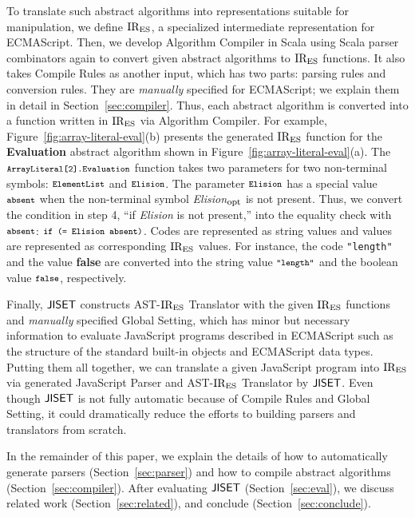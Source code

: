 To translate such abstract algorithms into representations
suitable for manipulation, we define \( \text{IR}_\text{ES} \), a specialized
intermediate representation for ECMAScript.  Then,
we develop \textsf{Algorithm Compiler} in Scala using Scala parser
combinators again to convert given abstract algorithms to \( \text{IR}_\text{ES} \)
functions.  It also takes \textsf{Compile Rules} as another input,
which has two parts: parsing rules and conversion rules.  They are
\textit{manually} specified for ECMAScript; we explain them in
detail in Section~\ref{sec:compiler}.  Thus, each abstract algorithm is
converted into a function written in \( \text{IR}_\text{ES} \) via \textsf{Algorithm Compiler}.
For example, Figure~\ref{fig:array-literal-eval}(b) presents the generated
\( \text{IR}_\text{ES} \) function for the \textbf{Evaluation} abstract algorithm shown in
Figure~\ref{fig:array-literal-eval}(a).
The \( \texttt{\footnotesize ArrayLiteral[2].Evaluation} \) function takes two parameters for
two non-terminal symbols: \( \texttt{\footnotesize ElementList} \) and \( \texttt{\footnotesize Elision} \).
The parameter \( \texttt{\footnotesize Elision} \) has a special value \( \texttt{\footnotesize absent} \) when
the non-terminal symbol \textit{Elision}$_{\mbox{\footnotesize opt}}$ is not
present.  Thus, we convert the condition in step 4,
``if \textit{Elision} is not present,'' into the equality check with \(
\texttt{\footnotesize absent} \): \( \texttt{\footnotesize if (= Elision absent)} \).  Codes are represented as
string values and values are represented as corresponding \( \text{IR}_\text{ES} \) values.
For instance, the code \texttt{\small "length"} and the value \textbf{false} are
converted into the string value \( \texttt{\footnotesize"length"} \) and the boolean value
\( \texttt{\footnotesize false} \), respectively.

Finally, \( \text{\sf JISET} \) constructs {\sf AST-\( \text{IR}_\text{ES} \) Translator} with the given
\( \text{IR}_\text{ES} \) functions and \textit{manually} specified {\sf Global Setting},
which has minor but necessary information to evaluate JavaScript programs
described in ECMAScript such as the structure of the standard
built-in objects and ECMAScript data types. Putting them all together, we can
translate a given JavaScript program into \( \text{IR}_\text{ES} \) via generated {\sf
JavaScript Parser} and {\sf AST-\( \text{IR}_\text{ES} \) Translator} by \( \text{\sf JISET} \).  Even
though \( \text{\sf JISET} \) is not fully automatic because of {\sf Compile Rules} and
{\sf Global Setting}, it could dramatically reduce the efforts to building
parsers and translators from scratch.

In the remainder of this paper, we explain the details of how to
automatically generate parsers (Section~\ref{sec:parser}) and how to compile
abstract algorithms (Section~\ref{sec:compiler}).  After evaluating \( \text{\sf JISET} \)
(Section~\ref{sec:eval}), we discuss related work (Section~\ref{sec:related}), and
conclude (Section~\ref{sec:conclude}).

